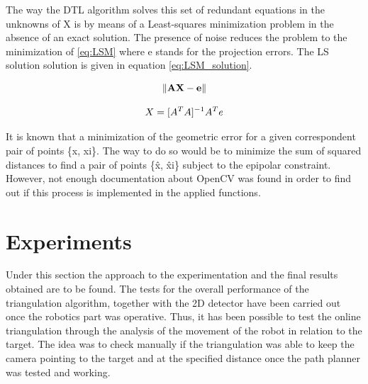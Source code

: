 The way the DTL algorithm solves this set of redundant equations in the unknowns of X is by means of a Least-squares minimization problem in the absence of an exact solution. 
The presence of noise reduces the problem to the minimization of \ref{eq:LSM} where e stands for the projection errors.
The LS solution solution is given in equation \ref{eq:LSM_solution}.

\begin{equation}
	\centering
	\lVert \mathbf{AX-e} \rVert 
	\label{eq:LSM}
\end{equation}

\begin{equation}
	\centering
	X = [A^{T}A]^{-1}A^{T}e
	\label{eq:LSM_solution}
\end{equation}

It is known that a minimization of the geometric error for a given correspondent pair of points \{x, xi\}. The way to do so would be to minimize the sum of squared distances to find a pair of points \{\^x, \^xi\} subject to the epipolar constraint. However, not enough documentation about OpenCV was found in order to find out if this process is implemented in the applied functions.

\section{Experiments}
Under this section the approach to the experimentation and the final results obtained are to be found.
The tests for the overall performance of the triangulation algorithm, together with the 2D detector have been carried out once the robotics part was operative. 
Thus, it has been possible to test the online triangulation through the analysis of the movement of the robot in relation to the target. 
The idea was to check manually if the triangulation was able to keep the camera pointing to the target and at the specified distance once the path planner was tested and working.



  